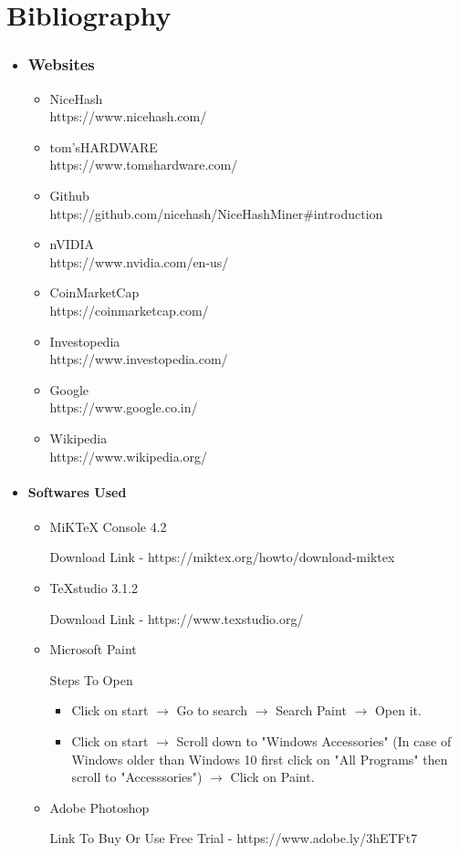 \chapter*{Bibliography}
\begin{itemize}
	\item\subsection*{ Websites}
	\begin{itemize}
		\item NiceHash\\
		https://www.nicehash.com/
		\item tom'sHARDWARE\\
		https://www.tomshardware.com/
		\item Github\\
		https://github.com/nicehash/NiceHashMiner\#introduction
		\item nVIDIA\\
		https://www.nvidia.com/en-us/
		\item CoinMarketCap\\
		https://coinmarketcap.com/
		\item Investopedia\\
		https://www.investopedia.com/
		\item Google\\
		https://www.google.co.in/
		\item Wikipedia\\
		https://www.wikipedia.org/
	\end{itemize}

	\item \subsubsection*{Softwares Used}
	\begin{itemize}
		\item MiKTeX Console 4.2
		
		Download Link - https://miktex.org/howto/download-miktex
		\item TeXstudio 3.1.2
		
		Download Link - https://www.texstudio.org/
		\item Microsoft Paint
		
		Steps To Open \begin{itemize}
			\item Click on start $\rightarrow$ Go to search $\rightarrow$ Search Paint $\rightarrow$ Open it.
			\item Click on start $\rightarrow$ Scroll down to "Windows Accessories" (In case of Windows older than Windows 10 first click on "All Programs" then scroll to "Accesssories") $\rightarrow$ Click on Paint.
		\end{itemize}
		\item Adobe Photoshop
		
		Link To Buy Or Use Free Trial - https://www.adobe.ly/3hETFt7
	\end{itemize}
\end{itemize}

